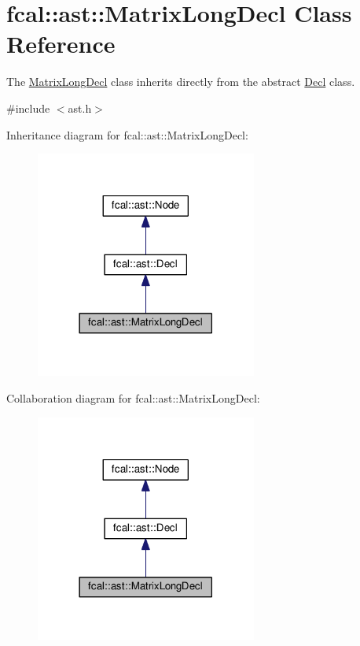 \hypertarget{classfcal_1_1ast_1_1MatrixLongDecl}{}\section{fcal\+:\+:ast\+:\+:Matrix\+Long\+Decl Class Reference}
\label{classfcal_1_1ast_1_1MatrixLongDecl}


The \hyperlink{classfcal_1_1ast_1_1MatrixLongDecl}{Matrix\+Long\+Decl} class inherits directly from the abstract \hyperlink{classfcal_1_1ast_1_1Decl}{Decl} class.  




{\ttfamily \#include $<$ast.\+h$>$}



Inheritance diagram for fcal\+:\+:ast\+:\+:Matrix\+Long\+Decl\+:
\nopagebreak
\begin{figure}[H]
\begin{center}
\leavevmode
\includegraphics[width=206pt]{classfcal_1_1ast_1_1MatrixLongDecl__inherit__graph}
\end{center}
\end{figure}


Collaboration diagram for fcal\+:\+:ast\+:\+:Matrix\+Long\+Decl\+:
\nopagebreak
\begin{figure}[H]
\begin{center}
\leavevmode
\includegraphics[width=206pt]{classfcal_1_1ast_1_1MatrixLongDecl__coll__graph}
\end{center}
\end{figure}
